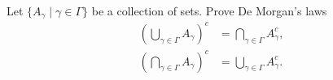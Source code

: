 \begin{exercise}
  \label{ex:hw01:de-morgan}
  Let $\{A_\gamma \mid \gamma \in \Gamma\}$ be a collection of sets.
  Prove De Morgan's laws
  \[
    \begin{aligned}
      \left(\bigcup_{\gamma\in\Gamma} A_\gamma\right)^c
        &= \bigcap_{\gamma\in\Gamma} A_\gamma^c,\\
      \left(\bigcap_{\gamma\in\Gamma} A_\gamma\right)^c
        &= \bigcup_{\gamma\in\Gamma} A_\gamma^c.
    \end{aligned}
  \]
\end{exercise}
